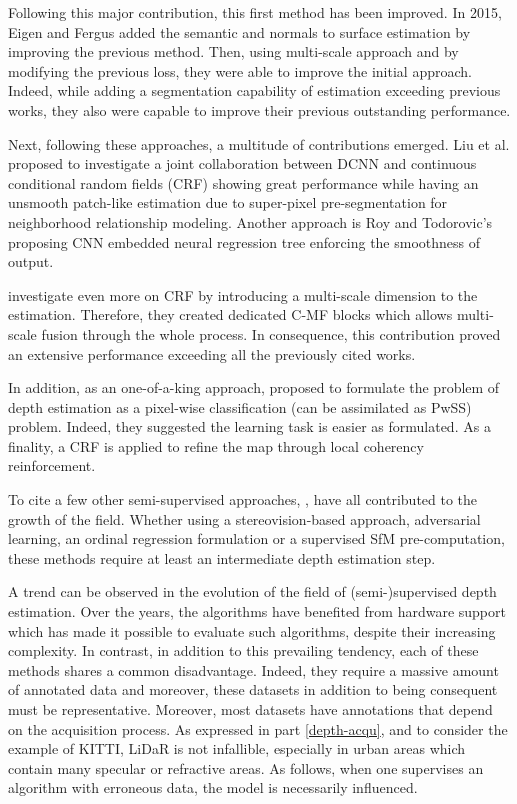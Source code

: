 Following this major contribution, this first method has been improved. In 2015, Eigen and Fergus \cite{eigen2015predicting} added the semantic and normals to surface estimation by improving the previous method. Then, using multi-scale approach and by modifying the previous loss, they were able to improve the initial approach. Indeed, while adding a segmentation capability of estimation exceeding previous works, they also were capable to improve their previous outstanding performance.

Next, following these approaches, a multitude of contributions emerged. Liu et al. \cite{liu2015deep} proposed to investigate a joint collaboration between DCNN and continuous conditional random fields (CRF) showing great performance while having an unsmooth patch-like estimation due to super-pixel pre-segmentation for neighborhood relationship modeling.
Another approach is Roy and Todorovic's \cite{roy2016monocular} proposing CNN embedded neural regression tree enforcing the smoothness of output. 
 
\cite{xu2017multi} investigate even more on CRF by introducing a multi-scale dimension to the estimation. Therefore, they created dedicated C-MF blocks which allows multi-scale fusion through the whole process. In consequence, this contribution proved an extensive performance exceeding all the previously cited works.

In addition, as an one-of-a-king approach, \cite{cao2017estimating} proposed to formulate the problem of depth estimation as a pixel-wise classification (can be assimilated as PwSS) problem. Indeed, they suggested the learning task is easier as formulated. As a finality, a CRF is applied to refine the map through local coherency reinforcement.

To cite a few other semi-supervised approaches, \cite{guo2018learning,kundu2018adadepth,fu2018deep,klodt2018supervising}, have all contributed to the growth of the field. 
Whether using a stereovision-based approach, adversarial learning, an ordinal regression formulation or a supervised SfM pre-computation, these methods require at least an intermediate depth estimation step. 

A trend can be observed in the evolution of the field of (semi-)supervised depth estimation. Over the years, the algorithms have benefited from hardware support which has made it possible to evaluate such algorithms, despite their increasing complexity. In contrast, in addition to this prevailing tendency, each of these methods shares a common disadvantage. Indeed, they require a massive amount of annotated data and moreover, these datasets in addition to being consequent must be representative. 
Moreover, most datasets have annotations that depend on the acquisition process. As expressed in part \ref{depth-acqu}, and to consider the example of KITTI, LiDaR is not infallible, especially in urban areas which contain many specular or refractive areas. As follows, when one supervises an algorithm with erroneous data, the model is necessarily influenced.

